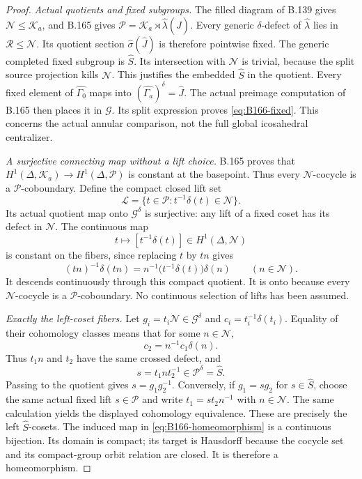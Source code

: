 \begin{proof}
\emph{Actual quotients and fixed subgroups.}
The filled diagram of B.139 gives
\(\mathcal N\le\mathcal K_a\), and B.165 gives
\(\mathcal P=\mathcal K_a\rtimes\widehat\lambda(\widehat J)\).
Every generic \(\delta\)-defect of \(\widehat\lambda\) lies in
\(\mathcal R\le\mathcal N\). Its quotient section
\(\widehat\sigma(\widehat J)\) is therefore pointwise fixed.
The generic completed fixed subgroup is \(\widehat S\).
Its intersection with \(\mathcal N\) is trivial, because the split
source projection kills \(\mathcal N\). This justifies the embedded
\(\widehat S\) in the quotient.
Every fixed element of \(\widehat{\Gamma_0}\) maps into
\((\widehat{\Gamma_a})^\delta=\widehat J\).
The actual preimage computation of B.165 then places it in
\(\mathcal G\). Its split expression proves
\eqref{eq:B166-fixed}. This concerns the actual annular comparison,
not the full global icosahedral centralizer.

\emph{A surjective connecting map without a lift choice.}
B.165 proves that
\(H^1(\Delta,\mathcal K_a)\to H^1(\Delta,\mathcal P)\)
is constant at the basepoint. Thus every \(\mathcal N\)-cocycle
is a \(\mathcal P\)-coboundary. Define the compact closed lift set
\[
 \mathcal L=\{t\in\mathcal P:
                       t^{-1}\delta(t)\in\mathcal N\}.
\]
Its actual quotient map onto \(\mathcal G^\delta\) is surjective:
any lift of a fixed coset has its defect in \(\mathcal N\).
The continuous map
\[
 t\longmapsto[t^{-1}\delta(t)]\in H^1(\Delta,\mathcal N)
\]
is constant on the fibers, since replacing \(t\) by \(tn\) gives
\[
 (tn)^{-1}\delta(tn)
       =n^{-1}\bigl(t^{-1}\delta(t)\bigr)\delta(n)
       \qquad(n\in\mathcal N).
\]
It descends continuously through this compact quotient.
It is onto because every \(\mathcal N\)-cocycle is a
\(\mathcal P\)-coboundary. No continuous selection of lifts has
been assumed.

\emph{Exactly the left-coset fibers.}
Let \(g_i=t_i\mathcal N\in\mathcal G^\delta\) and
\(c_i=t_i^{-1}\delta(t_i)\). Equality of their cohomology classes
means that for some \(n\in\mathcal N\),
\[
                         c_2=n^{-1}c_1\delta(n).
\]
Thus \(t_1n\) and \(t_2\) have the same crossed defect, and
\[
 s=t_1nt_2^{-1}\in\mathcal P^\delta=\widehat S.
\]
Passing to the quotient gives \(s=g_1g_2^{-1}\).
Conversely, if \(g_1=sg_2\) for \(s\in\widehat S\), choose
the same actual fixed lift \(s\in\mathcal P\) and write
\(t_1=st_2n^{-1}\) with \(n\in\mathcal N\).
The same calculation yields the displayed cohomology equivalence.
These are precisely the left \(\widehat S\)-cosets.
The induced map in \eqref{eq:B166-homeomorphism} is a continuous
bijection. Its domain is compact; its target is Hausdorff because
the cocycle set and its compact-group orbit relation are closed.
It is therefore a homeomorphism.


\end{proof}

